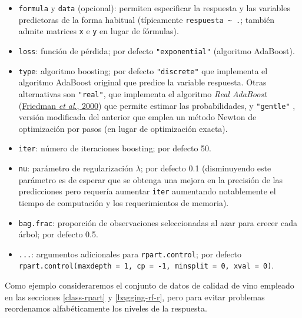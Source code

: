 \documentclass[
]{book}
\theoremstyle{break}
\theoremstyle{definition}
\theoremstyle{definition}
\theoremstyle{definition}
\theoremstyle{remark}
\begin{document}
\begin{itemize}
\item
  \texttt{formula} y \texttt{data} (opcional): permiten especificar la respuesta y las variables predictoras de la forma habitual (típicamente \texttt{respuesta\ \textasciitilde{}\ .}; también admite matrices \texttt{x} e \texttt{y} en lugar de fórmulas).
\item
  \texttt{loss}: función de pérdida; por defecto \texttt{"exponential"} (algoritmo AdaBoost).
\item
  \texttt{type}: algoritmo boosting; por defecto \texttt{"discrete"} que implementa el algoritmo AdaBoost original que predice la variable respuesta. Otras alternativas son \texttt{"real"}, que implementa el algoritmo \emph{Real AdaBoost} (\href{https://projecteuclid.org/euclid.aos/1016218223}{Friedman \emph{et al}., 2000}) que permite estimar las probabilidades, y \texttt{"gentle"} , versión modificada del anterior que emplea un método Newton de optimización por pasos (en lugar de optimización exacta).
\item
  \texttt{iter}: número de iteraciones boosting; por defecto 50.
\item
  \texttt{nu}: parámetro de regularización \(\lambda\); por defecto 0.1 (disminuyendo este parámetro es de esperar que se obtenga una mejora en la precisión de las predicciones pero requería aumentar \texttt{iter} aumentando notablemente el tiempo de computación y los requerimientos de memoria).
\item
  \texttt{bag.frac}: proporción de observaciones seleccionadas al azar para crecer cada árbol; por defecto 0.5.
\item
  \texttt{...}: argumentos adicionales para \texttt{rpart.control}; por defecto \texttt{rpart.control(maxdepth\ =\ 1,\ cp\ =\ -1,\ minsplit\ =\ 0,\ xval\ =\ 0)}.
\end{itemize}

Como ejemplo consideraremos el conjunto de datos de calidad de vino empleado en las secciones \ref{class-rpart} y \ref{bagging-rf-r}, pero para evitar problemas reordenamos alfabéticamente los niveles de la respuesta.
\end{document}
